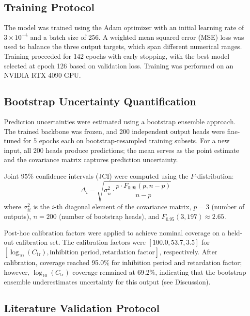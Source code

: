 \documentclass[journal=mamobx,manuscript=article]{achemso}
\begin{document}
\subsection{Training Protocol}

The model was trained using the Adam optimizer with an initial learning rate of $3 \times 10^{-4}$ and a batch size of 256. A weighted mean squared error (MSE) loss was used to balance the three output targets, which span different numerical ranges. Training proceeded for 142 epochs with early stopping, with the best model selected at epoch 126 based on validation loss. Training was performed on an NVIDIA RTX 4090 GPU.

\subsection{Bootstrap Uncertainty Quantification}

Prediction uncertainties were estimated using a bootstrap ensemble approach.\cite{ViTRR2025} The trained backbone was frozen, and 200 independent output heads were fine-tuned for 5 epochs each on bootstrap-resampled training subsets. For a new input, all 200 heads produce predictions; the mean serves as the point estimate and the covariance matrix captures prediction uncertainty.

Joint 95\% confidence intervals (JCI) were computed using the $F$-distribution:
\begin{equation}
    \Delta_i = \sqrt{\sigma_{ii}^2 \cdot \frac{p \cdot F_{0.95}(p, n-p)}{n-p}}
\end{equation}
where $\sigma_{ii}^2$ is the $i$-th diagonal element of the covariance matrix, $p = 3$ (number of outputs), $n = 200$ (number of bootstrap heads), and $F_{0.95}(3, 197) \approx 2.65$.

Post-hoc calibration factors were applied to achieve nominal coverage on a held-out calibration set. The calibration factors were $[100.0, 53.7, 3.5]$ for $[\log_{10}(C_\mathrm{tr}), \text{inhibition period}, \text{retardation factor}]$, respectively. After calibration, coverage reached 95.0\% for inhibition period and retardation factor; however, $\log_{10}(C_\mathrm{tr})$ coverage remained at 69.2\%, indicating that the bootstrap ensemble underestimates uncertainty for this output (see Discussion).

\subsection{Literature Validation Protocol}
\end{document}
